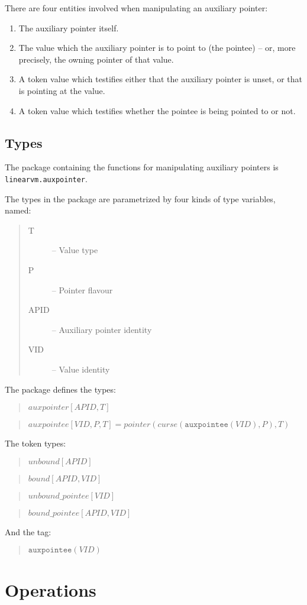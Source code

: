 \documentclass[a4paper]{book}
\newcommand\TypeDefinition[1]{\begin{quote}$\mathit{#1}$\end{quote}}
\newcommand\TagDefinitionII[2]{\begin{quote}$\mathtt{#1}(\mathit{#2})$\end{quote}}
\begin{document}
\noindent
There are four entities involved when manipulating an auxiliary pointer:
\begin{enumerate}
\item The auxiliary pointer itself.
\item The value which the auxiliary pointer is to point to (the pointee) --
  or, more precisely, the owning pointer of that value.
\item A token value which testifies either that the auxiliary pointer is unset,
  or that is pointing at the value.
\item A token value which testifies whether the pointee is being
  pointed to or not.
\end{enumerate}

\subsection*{Types}
The package containing the functions for manipulating auxiliary pointers is
\texttt{linearvm.auxpointer}.

\smallskip
The types in the package are parametrized by four kinds of type variables, named:
\begin{quote}
\begin{description}
\item[T] -- Value type
\item[P] -- Pointer flavour
\item[APID] -- Auxiliary pointer identity
\item[VID] -- Value identity
\end{description}
\end{quote}


\smallskip
\noindent
The package defines the types:

\TypeDefinition{auxpointer[APID,T]}
\TypeDefinition{auxpointee[VID,P,T] = pointer(curse(\texttt{auxpointee}(VID),P),T)}

\noindent
The token types:

\TypeDefinition{unbound[APID]}
\TypeDefinition{bound[APID,VID]}
\TypeDefinition{unbound\_pointee[VID]}
\TypeDefinition{bound\_pointee[APID,VID]}

\noindent
And the tag:
\TagDefinitionII{auxpointee}{VID}


\section*{Operations}
\end{document}
